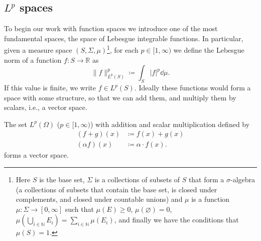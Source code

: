 \subsection{\texorpdfstring{\(L^p\)}{Lp} spaces}\label{subsec:lp}
To begin our work with function spaces we introduce one of the most fundamental
spaces, the space of Lebesgue integrable functions. In particular, given a
measure space \((S,\Sigma, \mu)\)\footnote{Here \(S\) is the base set,
\(\Sigma\) is a collections of subsets of \(S\) that form a \(\sigma\)-algebra
(a collections of subsets that contain the base set, is closed under
complements, and closed under countable unions) and \(\mu\) is a function
\(\mu:\Sigma\to[0,\infty]\) such that \(\mu(E)\geq 0\),
\(\mu(\varnothing) = 0\), \(\mu\left(\bigcup_{i\in\mathbb{N}}E_i\right) = \sum_{i\in\mathbb{N}}\mu(E_i)\),
and finally we have the conditions that \(\mu(S) = 1\).}, for each
\(p\in[1,\infty)\) we define the Lebesgue norm of a function %
\(f:S\to\mathbb{R}\) as
\begin{equation}
    \|f\|_{L^p(S)}^p\coloneqq \int_S|f|^p\dd{\mu}.
\end{equation}
If this value is finite, we write \(f\in L^p(S)\). Ideally these functions would
form a space with some structure, so that we can add them, and multiply them by
scalars, i.e., a vector space.
\begin{lemma}
    The set \(L^p(\Omega)\) (\(p\in[1,\infty)\)) with addition and scalar %
    multiplication defined by
    \begin{align}
        (f + g)(x)    & \coloneqq f(x) + g(x) \\
        (\alpha f)(x) & \coloneqq \alpha\cdot f(x).
    \end{align}
    forms a vector space.
\end{lemma}
